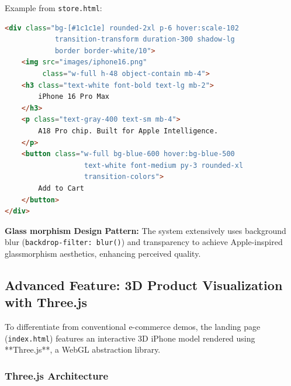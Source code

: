 Example from \texttt{store.html}:

\begin{lstlisting}[language=HTML, caption=Tailwind CSS Utility Classes for Product Card]
<div class="bg-[#1c1c1e] rounded-2xl p-6 hover:scale-102 
            transition-transform duration-300 shadow-lg 
            border border-white/10">
    <img src="images/iphone16.png" 
         class="w-full h-48 object-contain mb-4">
    <h3 class="text-white font-bold text-lg mb-2">
        iPhone 16 Pro Max
    </h3>
    <p class="text-gray-400 text-sm mb-4">
        A18 Pro chip. Built for Apple Intelligence.
    </p>
    <button class="w-full bg-blue-600 hover:bg-blue-500 
                   text-white font-medium py-3 rounded-xl 
                   transition-colors">
        Add to Cart
    </button>
</div>
\end{lstlisting}

\textbf{Glass morphism Design Pattern:} The system extensively uses background blur (\texttt{backdrop-filter: blur()}) and transparency to achieve Apple-inspired glassmorphism aesthetics, enhancing perceived quality.

\subsection{Advanced Feature: 3D Product Visualization with Three.js}

To differentiate from conventional e-commerce demos, the landing page (\texttt{index.html}) features an interactive 3D iPhone model rendered using **Three.js**, a WebGL abstraction library.

\subsubsection{Three.js Architecture}

